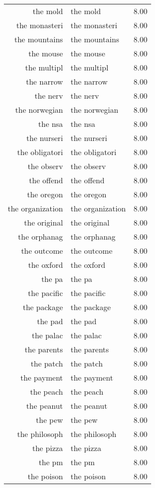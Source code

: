 \begin{table}[ht]
\begin{tabular}{rlr}
  the mold & the mold & 8.00 \\ 
  the monasteri & the monasteri & 8.00 \\ 
  the mountains & the mountains & 8.00 \\ 
  the mouse & the mouse & 8.00 \\ 
  the multipl & the multipl & 8.00 \\ 
  the narrow & the narrow & 8.00 \\ 
  the nerv & the nerv & 8.00 \\ 
  the norwegian & the norwegian & 8.00 \\ 
  the nsa & the nsa & 8.00 \\ 
  the nurseri & the nurseri & 8.00 \\ 
  the obligatori & the obligatori & 8.00 \\ 
  the observ & the observ & 8.00 \\ 
  the offend & the offend & 8.00 \\ 
  the oregon & the oregon & 8.00 \\ 
  the organization & the organization & 8.00 \\ 
  the original & the original & 8.00 \\ 
  the orphanag & the orphanag & 8.00 \\ 
  the outcome & the outcome & 8.00 \\ 
  the oxford & the oxford & 8.00 \\ 
  the pa & the pa & 8.00 \\ 
  the pacific & the pacific & 8.00 \\ 
  the package & the package & 8.00 \\ 
  the pad & the pad & 8.00 \\ 
  the palac & the palac & 8.00 \\ 
  the parents & the parents & 8.00 \\ 
  the patch & the patch & 8.00 \\ 
  the payment & the payment & 8.00 \\ 
  the peach & the peach & 8.00 \\ 
  the peanut & the peanut & 8.00 \\ 
  the pew & the pew & 8.00 \\ 
  the philosoph & the philosoph & 8.00 \\ 
  the pizza & the pizza & 8.00 \\ 
  the pm & the pm & 8.00 \\ 
  the poison & the poison & 8.00 \\ 

\end{tabular}
\end{table}
